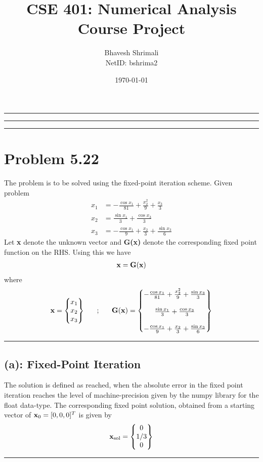 
\title{\bf CSE 401: Numerical Analysis \\ Course Project}
\author{Bhavesh Shrimali \\ NetID: bshrima2}
\date{\today}
\titlespacing*{\title}{-2ex}{*-2ex}{-2ex}

\maketitle \hrule \hrule \hrule
\section*{Problem 5.22}
The problem is to be solved using the fixed-point iteration scheme. 
Given problem 
\begin{align*}
x_1
& =
-\frac{\cos x_1}{81} + \frac{x^2_2}{9}+\frac{x_3}{3}\\
x_2 & = \frac{\sin x_1}{3} + \frac{\cos x_3}{3}\\
x_3 & = -\frac{\cos x_1}{9}+ \frac{x_2}{3}+\frac{\sin x_3}{6}
\end{align*}
Let {\bf x} denote the unknown vector and {\bf G(x)} denote the corresponding fixed point function on the RHS. Using this we have
\begin{align*}
{\bf x} = {\bf G(x)}
\end{align*}
where 
\[
{\bf x} = \begin{Bmatrix}
x_1 \\ x_2 \\ x_3
\end{Bmatrix} \ \ \ \ \ ; \ \ \ \ \ {\bf G(x)} = 
\begin{Bmatrix}
-\frac{\cos x_1}{81} + \frac{x^2_2}{9}+\frac{\sin x_3}{3}\\ \\
\frac{\sin x_1}{3} + \frac{\cos x_3}{3}\\ \\ 
-\frac{\cos x_1}{9}+ \frac{x_2}{3}+\frac{\sin x_3}{6}
\end{Bmatrix}
\] \hrule
\subsection*{(a): Fixed-Point Iteration}
The solution is defined as reached, when the absolute error in the fixed point iteration reaches the level of machine-precision given by the numpy library for the float data-type. The corresponding fixed point solution, obtained from a starting vector of ${\bf x}_0 = [0,0,0]^T$ is given by
\begin{align*}
{\bf x_{\rm sol}} =
\begin{Bmatrix}
0\\1/3\\0
\end{Bmatrix}
\end{align*}\hrule
